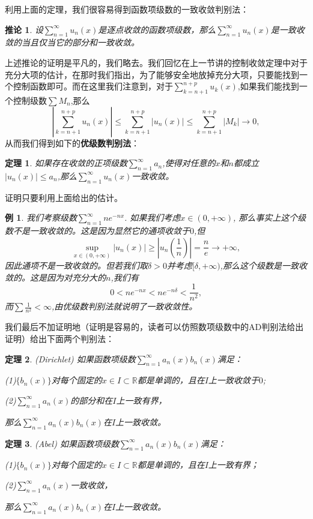 \documentclass{article}
\newtheorem{theorem}{定理}[subsection]
\newtheorem{example}{例}[subsection]
\newtheorem{corollary}{推论}[subsection]
\begin{document}
利用上面的定理，我们很容易得到函数项级数的一致收敛判别法：
\begin{corollary}
设$\sum_{n=1}^\infty u_n(x)$是逐点收敛的函数项级数，那么$\sum_{n=1}^\infty u_n(x)$是一致收敛的当且仅当它的部分和一致收敛。
\end{corollary}
上述推论的证明是平凡的，我们略去。我们回忆在上一节讲的控制收敛定理中对于充分大项的估计，在那时我们指出，为了能够安全地放掉充分大项，只要能找到一个控制函数即可。而在这里我们注意到，对于$\sum_{k=n+1}^{n+p}u_k(x)$,如果我们能找到一个控制级数$\sum M_n$,那么
$$\left|\sum_{k=n+1}^{n+p}u_n(x)\right|\le\sum_{k=n+1}^{n+p}|u_n(x)|\le\sum_{k=n+1}^{n+p}|M_k|\to 0,$$
从而我们得到如下的\textbf{优级数判别法}：
\begin{theorem}
如果存在收敛的正项级数$\sum_{n=1}^\infty a_n$,使得对任意的$x$和$n$都成立$|u_n(x)|\le a_n$,那么$\sum_{n=1}^\infty u_n(x)$一致收敛。
\end{theorem}
证明只要利用上面给出的估计。
\begin{example}
我们考察级数$\sum_{n=1}^\infty ne^{-nx}$. 如果我们考虑$x\in(0,+\infty)$, 那么事实上这个级数不是一致收敛的。这是因为显然它的通项收敛于$0$,但
$$
\mathop {\mathrm{sup}} \limits_{x\in \left( 0,+\infty \right)}\left| u_n\left( x \right) \right|\ge \left| u_n\left( \frac{1}{n} \right) \right|=\frac{n}{e}\rightarrow +\infty ,
$$
因此通项不是一致收敛的。但若我们取$\delta>0$并考虑$[\delta,+\infty)$,那么这个级数是一致收敛的。这是因为对充分大的$n$,我们有
$$
0<ne^{-nx}<ne^{-n\delta}<\frac{1}{n^2},
$$
而$\sum\frac{1}{n^2}<\infty$,由优级数判别法就说明了一致收敛性。
\end{example}
我们最后不加证明地（证明是容易的，读者可以仿照数项级数中的AD判别法给出证明）给出下面两个判别法：
\begin{theorem}(Dirichlet)
如果函数项级数$\sum_{n=1}^\infty a_n(x)b_n(x)$满足：\par
(1)$\{b_n(x)\}$对每个固定的$x\in I\subset\mathbb{R}$都是单调的，且在$I$上一致收敛于$0$;\par
(2)$\sum_{n=1}^\infty a_n(x)$的部分和在$I$上一致有界，\par
那么$\sum_{n=1}^\infty a_n(x)b_n(x)$在$I$上一致收敛。
\end{theorem}
\begin{theorem}(Abel)
如果函数项级数$\sum_{n=1}^\infty a_n(x)b_n(x)$满足：\par
(1)$\{b_n(x)\}$对每个固定的$x\in I\subset\mathbb{R}$都是单调的，且在$I$上一致有界；\par
(2)$\sum_{n=1}^\infty a_n(x)$一致收敛，\par
那么$\sum_{n=1}^\infty a_n(x)b_n(x)$在$I$上一致收敛。
\end{theorem}
\newpage
\end{document}
